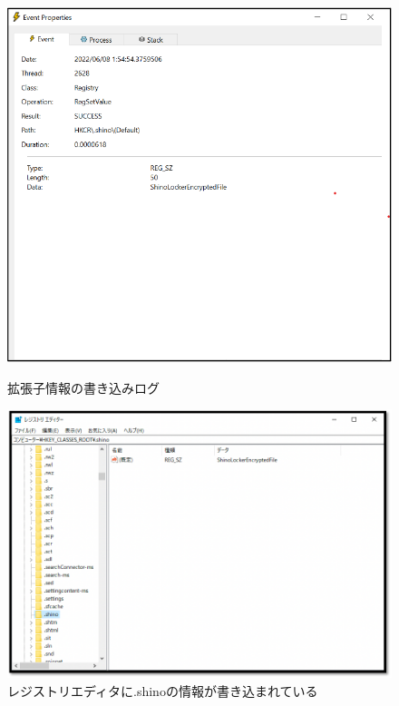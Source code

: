 \documentclass[dvipdfmx,autodetect-engine]{jsarticle}
\begin{document}
\begin{figure}[H]
  \centering
  \begin{minipage}[b]{0.45\linewidth}
  \begin{center}
    \includegraphics[keepaspectratio,scale=0.45]{pic16.png}
    \end{center}
    \caption{拡張子情報の書き込みログ}
  \end{minipage}
  \begin{minipage}[b]{0.45\linewidth}
  \begin{center}
    \includegraphics[keepaspectratio,scale=0.36]{pic17.png}
    \end{center}
    \caption{レジストリエディタに.shinoの情報が書き込まれている}
  \end{minipage}
\end{figure}
\end{document}

